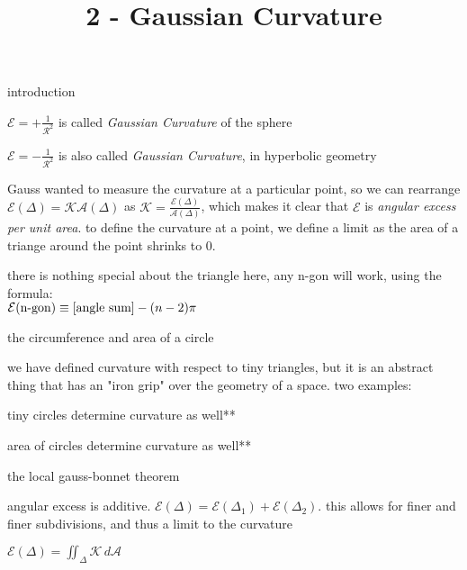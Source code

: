 \documentclass{article}
\title{2 - Gaussian Curvature}
\newenvironment{andrew_section}[1]
    {
    \section{#1}
    \begin{itemize}
    }
    {
    \end{itemize}
    }
\begin{document}
\maketitle

\begin{andrew_section}{introduction}
    \item 
        $\mathcal{E} = + \frac{1}{\mathcal{R}^2}$ is called 
        \emph{Gaussian Curvature} of the sphere
    \item 
        $\mathcal{E} = - \frac{1}{\mathcal{R}^2}$ is also called 
        \emph{Gaussian Curvature}, in hyperbolic geometry
    \item 
        Gauss wanted to measure the curvature at a particular point,
        so we can rearrange 
        $\mathcal{E}(\Delta) = \mathcal{K}\mathcal{A} (\Delta)$ as
        $\mathcal{K} = \frac{\mathcal{E}(\Delta)}{\mathcal{A} (\Delta)}$,
        which makes it clear that $\mathcal{E}$ is 
        \emph{angular excess per unit area}.  to define the curvature
        at a point, we define a limit as the area of a triange around
        the point shrinks to 0.
    \item 
        there is nothing special about the triangle here, any n-gon will
        work, using the formula: \\ 
        $\mathcal{E}(\textnormal{n-gon}) \equiv [\textnormal{angle sum}]
        - (n - 2)\pi$
\end{andrew_section}

\begin{andrew_section}{the circumference and area of a circle}
    \item 
        we have defined curvature with respect to tiny triangles,
        but it is an abstract thing that has an "iron grip" over the geometry
        of a space.  two examples:
    \item 
        tiny circles determine curvature as well**
    \item 
        area of circles determine curvature as well**
\end{andrew_section}

\begin{andrew_section}{the local gauss-bonnet theorem}
    \item 
        angular excess is additive.  
        $\mathcal{E}(\Delta) = \mathcal{E}(\Delta_1) + \mathcal{E}(\Delta_2)$.
        this allows for finer and finer subdivisions, and thus a limit to the curvature 
    \item 
        $\mathcal{E}(\Delta) = \iint_\Delta \mathcal{K} \,d\mathcal{A}$
        
\end{andrew_section}
\end{document}
